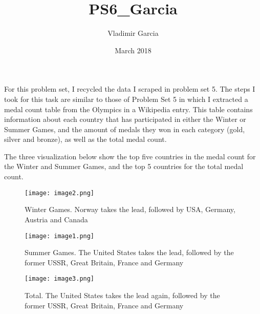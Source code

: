 \documentclass{article}
\title{PS6_Garcia}
\author{Vladimir Garcia}
\date{March 2018}
\begin{document}
\maketitle
For this problem set, I recycled the data I scraped in problem set 5. The steps I took for this task are similar to those of Problem Set 5 in which I extracted a medal count table from the Olympics in a Wikipedia entry. This table contains information about each country that has participated in either the Winter or Summer Games, and the amount of medals they won in each category (gold, silver and bronze), as well as the total medal count. 

The three visualization below show the top five countries in the medal count for the Winter and Summer Games, and the top 5 countries for the total medal count.
\begin{figure}
    \centering
    \texttt{[image: image2.png]}
    \caption{Winter Games. Norway takes the lead, followed by USA, Germany, Austria and Canada}
    \label{fig:Winter}
\end{figure}

\begin{figure}
    \centering
    \texttt{[image: image1.png]}
    \caption{Summer Games. The United States takes the lead, followed by the former USSR, Great Britain, France and Germany}
    \label{fig:Summer}
\end{figure}

\begin{figure}
    \centering
    \texttt{[image: image3.png]}
    \caption{Total. The United States takes the lead again, followed by the former USSR, Great Britain, France and Germany}
    \label{fig:Total}
\end{figure}
\end{document}
